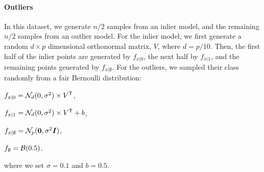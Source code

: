 \documentclass[10pt]{article}
\begin{document}










\paragraph*{Outliers} In this dataset, we generate $n/2$ samples from an inlier model, and the remaining $n/2$ samples from an outlier model.  For the inlier model, we first generate a random $d \times p$ dimensional orthonormal matrix, $V$, where $d=p/10$.  Then, the first half of the inlier points are generated by $f_{x|0}$, the next half by $f_{x|1}$, and the remaining points generated by $f_{x | \emptyset}$. For the outliers, we sampled their class randomly from a fair Bernoulli distribution:
\begin{compactitem}
\item $f_{x|0} = \mathcal{N}_d(0,\sigma^2) \times V^{\mathsf{T}}$,
\item $f_{x|1} = \mathcal{N}_d(0,\sigma^2) \times V^{\mathsf{T}} + b$,
\item $f_{x|\emptyset} = \mathcal{N}_p(\boldsymbol{0},\sigma^2\boldsymbol{I})$,
\item $f_{\emptyset} = \mathcal{B}(0.5)$.
\end{compactitem}
where we set $\sigma=0.1$ and $b=0.5$.






\clearpage
\end{document}
